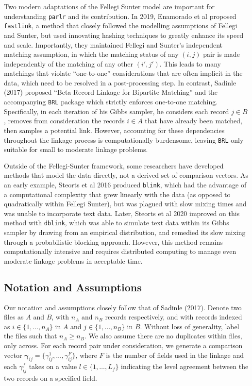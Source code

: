 \documentclass[
  12pt,
]{article}
\begin{document}
Two modern adaptations of the Fellegi Sunter model are important for
understanding \texttt{parlr} and its contribution. In 2019, Enamorado et
al proposed \texttt{fastlink}, a method that closely followed the
modelling assumptions of Fellegi and Sunter, but used innovating hashing
techniques to greatly enhance its speed and scale. Importantly, they
maintained Fellegi and Sunter's independent matching assumption, in
which the matching status of any \((i,j)\) pair is made independently of
the matching of any other \((i', j')\). This leads to many matchings
that violate ``one-to-one'' considerations that are often implicit in
the data, which need to be resolved in a post-processing step. In
contrast, Sadinle (2017) proposed ``Beta Record Linkage for Bipartite
Matching'' and the accompanying \texttt{BRL} package which strictly
enforces one-to-one matching. Specifically, in each iteration of his
Gibbs sampler, he considers each record \(j\in B\), removes from
consideration the records \(i\in A\) that have already been matched,
then samples a potential link. However, accounting for these
dependencies throughout the linkage process is computationally
burdensome, leaving \texttt{BRL} only suitable for small to moderate
linkage problems.

Outside of the Fellegi-Sunter framework, some researchers have developed
methods that model the data directly, not a derived set of comparison
vectors. As an early example, Steorts et al 2016 produced
\texttt{blink}, which had the advantage of a computational complexity
that grew linearly with the data (as opposed to quadratically within
Fellegi Sunter), but was plagued with slow mixing times and was unable
to incorporate text data. Later, Steorts et al 2020 improved on this
method with \texttt{dblink}, which was able to simulate text data within
its Gibbs sampler by drawing from an empirical distribution, and
remedied its slow mixing through a probabilistic blocking approach.
However, this method remains computationally intensive and requires
distributed computing to manage even moderate linkage problems in
acceptable time.

\hypertarget{notation-and-assumptions}{%
\subsection{Notation and Assumptions}\label{notation-and-assumptions}}

Our notation and assumptions closely follow that of Sadinle (2017).
Denote two files as \(A\) and \(B\), with \(n_A\) and \(n_B\) records
respectively, and with records indexed as \(i \in \{1, \ldots, n_A\}\)
in \(A\) and \(j \in \{1, \ldots, n_B\}\) in \(B\). Without loss of
generality, label the files such that \(n_A \geq n_B\). We also assume
there are no duplicates within files, only across. For each record pair
under consideration, we generate a comparison vector
\(\boldsymbol{\gamma}_{ij} = \{\gamma_{ij}^1, \ldots, \gamma_{ij}^F\}\),
where \(F\) is the number of fields used in the linkage and each
\(\gamma_{ij}^f\) takes on a value \(l \in \{1, \ldots, L_f\}\)
indicating the level agreement between the two records on a specified
field.
\end{document}
